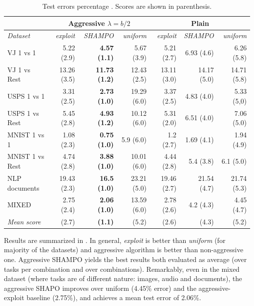 \begin{table}[h] 
\begin{centering}
\caption{Test errors percentage . Scores are shown in parenthesis.}
\label{tab:table1}
{\scriptsize	
\begin{tabular}{|l|r|r|r|r|r|r|}
\hline
                         & \multicolumn{3}{c|}{\textbf{Aggressive $\lambda=b/2$}}               & \multicolumn{3}{c|}{\textbf{Plain}}                 \\ \hline
\textit{Dataset}         & \textit{exploit} & \textit{SHAMPO}         & \textit{uniform} & \textit{exploit} & \textit{SHAMPO} & \textit{uniform} \\ \hline
{VJ 1 vs 1 }        & 5.22 (2.9)       & \textbf{4.57 (1.1)}   & 5.67 (3.9)       & 5.21 (2.7)       & 6.93 (4.6)    & 6.26 (5.8)       \\
\textrm{VJ 1 vs Rest}    & 13.26 (3.5)      & \textbf{11.73 (1.2)} & 12.43 (2.5)      & 13.11 (3.0)        & 14.17 (5.0)     & 14.71 (5.8)     \\
\textrm{USPS 1 vs 1}      & 3.31 (2.5)       & \textbf{2.73 (1.0)}     & 19.29 (6.0)        & 3.37 (2.5)       & 4.83 (4.0)      & 5.33 (5,0)         \\
\textrm{USPS 1 vs Rest}  & 5.45 (2.8)      & \textbf{4.93 (1.2)}  & 10.12 (6.0)        & 5.31 (2.0)         & 6.51 (4.0)      & 7.06 (5.0)         \\
\textrm{MNIST 1 vs 1}     & 1.08 (2.3)       & \textbf{0.75 (1.0)}     & 5.9 (6.0)         & 1.2 (2.7)       & 1.69 (4.1)      & 1.94 (4.9)     \\
\textrm{MNIST 1 vs Rest} & 4.74 (2.8)      & \textbf{3.88 (1.0)}     & 10.01 (6.0)       & 4.44 (2.8)      & 5.4 (3.8)    & 6.1 (5.0)          \\
\textrm{NLP documents} & 19.43 (2.3)     & \textbf{16.5 (1.0)}     & 23.21 (5.0)        & 19.46 (2.7)     & 21.54 (4.7)  & 21.74 (5.3)     \\
\textrm{MIXED}           & 2.75 (2.4)       & \textbf{2.06 (1.0)}     & 13.59 (6.0)        & 2.78 (2.6)       & 4.2 (4.3)     & 4.45 (4.7)       \\ \hline
\textit{Mean score}      & (2.7)           & \textbf{(1.1)}       & (5.2)           & (2.6)           & (4.3)        & (5.2)           \\ \hline
\end{tabular}
}
\end{centering}
\end{table}

Results  are summarized in .  In general, {\em exploit} is better than {\em uniform}
 (for majority of the datasets) and aggressive algorithm is better than non-aggressive one. 
 Aggressive SHAMPO yields the best results both evaluated as average 
(over tasks per combination and over combinations). Remarkably, even in the mixed dataset 
(where tasks are of different nature: images, audio and documents), the aggressive SHAPO improves over 
uniform (4.45\% error) and the aggressive-exploit baseline (2.75\%), and achieves a mean test error of 2.06\%.

